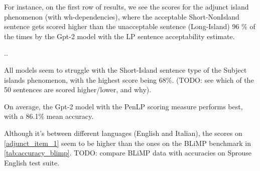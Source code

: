 For instance, on the first row of results, we see the scores for the adjunct island phenomenon (with wh-dependencies), where the acceptable Short-NonIsland sentence gets scored higher than the unacceptable sentence (Long-Island) 96 \% of the times by the Gpt-2 model with the LP sentence acceptability estimate.

..

All models seem to struggle with the Short-Island sentence type of the Subject islands phenomenon, with the highest score being 68\%. (TODO: see which of the 50 sentences are scored higher/lower, and why).

On average, the Gpt-2 model with the PenLP scoring measure performs best, with a 86.1\% mean accuracy.

Although it's between different languages (English and Italian), the scores on \autoref{adjunct_item_1} seem to be higher than the ones on the BLiMP benchmark in \autoref{tab:accuracy_blimp}. TODO: compare BLiMP data with accuracies on Sprouse English test suite.


